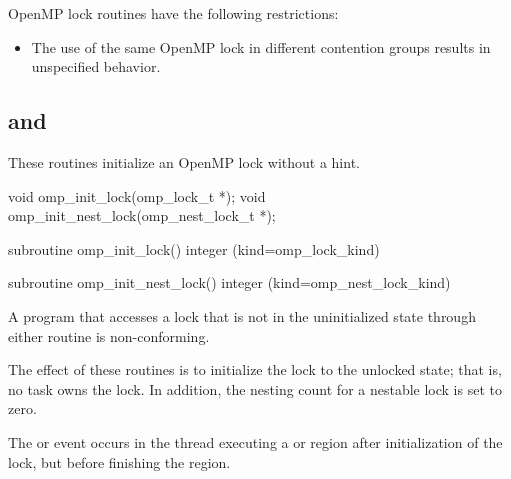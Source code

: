 \restrictions
OpenMP lock routines have the following restrictions:

\begin{itemize}
\item The use of the same OpenMP lock in different contention groups results in
unspecified behavior.
\end{itemize}










\subsection{ and }
\label{subsec:omp_init_lock and omp_init_nest_lock}
\summary
These routines initialize an OpenMP lock without a hint.

\format
\begin{ccppspecific}
\begin{ompcFunction}
void omp_init_lock(omp_lock_t *);
void omp_init_nest_lock(omp_nest_lock_t *);
\end{ompcFunction}
\end{ccppspecific}

\begin{fortranspecific}
\begin{ompfSubroutine}
subroutine omp_init_lock()
integer (kind=omp_lock_kind) 

subroutine omp_init_nest_lock()
integer (kind=omp_nest_lock_kind) 
\end{ompfSubroutine}
\end{fortranspecific}

\constraints
A program that accesses a lock that is not in the uninitialized state through either routine
is non-conforming.

\effect
The effect of these routines is to initialize the lock to the unlocked state; that is, no task
owns the lock. In addition, the nesting count for a nestable lock is set to zero.

\events

The  or  event occurs in the thread
executing a  or  region
after initialization of the lock, but before finishing the region.

